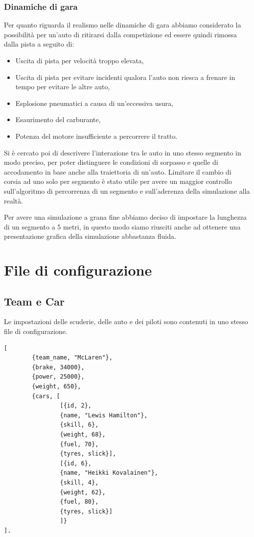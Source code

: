 \documentclass[11pt,a4paper]{report}
\begin{document}
\subsection*{Dinamiche di gara}
Per quanto riguarda il realismo nelle dinamiche di gara abbiamo considerato la possibilità per un'auto di ritirarsi dalla competizione ed essere quindi rimossa dalla pista a seguito di:
\begin{itemize}
\item Uscita di pista per velocità troppo elevata,
\item Uscita di pista per evitare incidenti qualora l'auto non riesca a frenare in tempo per evitare le altre auto,
\item Esplosione pneumatici a causa di un'eccessiva usura,
\item Esaurimento del carburante,
\item Potenza del motore insufficiente a percorrere il tratto.
\end{itemize}

Si è cercato poi di descrivere l'interazione tra le auto in uno stesso segmento in modo preciso, per poter distinguere le condizioni di sorpasso e quelle di accodamento in base anche alla traiettoria di un'auto. Limitare il cambio di corsia ad uno solo per segmento è stato utile per avere un maggior controllo sull'algoritmo di percorrenza di un segmento e sull'aderenza della simulazione alla realtà.

Per avere una simulazione a grana fine abbiamo deciso di impostare la lunghezza di un segmento a 5 metri, in questo modo siamo riusciti anche ad ottenere una presentazione grafica della simulazione abbastanza fluida.

\appendix

\chapter{File di configurazione}
\section*{Team e Car}
Le impostazioni delle scuderie, delle auto e dei piloti sono contenuti in uno stesso file di configurazione.
\begin{lstlisting}
[
        {team_name, "McLaren"},
        {brake, 34000},
        {power, 25000},
        {weight, 650},
        {cars, [
                [{id, 2},
                {name, "Lewis Hamilton"},
                {skill, 6},
                {weight, 68},
                {fuel, 70},
                {tyres, slick}],
                [{id, 6},
                {name, "Heikki Kovalainen"},
                {skill, 4},
                {weight, 62},
                {fuel, 80},
                {tyres, slick}]
                ]}
].
\end{lstlisting}
\end{document}
